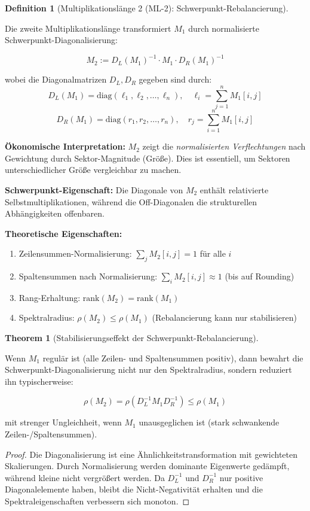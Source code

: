 \documentclass[a4paper,12pt]{article}
\theoremstyle{definition}
\newtheorem{definition}{Definition}
\newtheorem{theorem}{Theorem}
\begin{document}
\begin{definition}[Multiplikationslänge 2 (ML-2): Schwerpunkt-Rebalancierung]
\label{def:ml2}

Die zweite Multiplikationslänge transformiert $M_1$ durch normalisierte Schwerpunkt-Diagonalisierung:

\[
M_2 := D_L(M_1)^{-1} \cdot M_1 \cdot D_R(M_1)^{-1}
\]

wobei die Diagonalmatrizen $D_L, D_R$ gegeben sind durch:
\[
D_L(M_1) = \text{diag}(\ell_1, \ell_2, \ldots, \ell_n), \quad \ell_i = \sum_{j=1}^n M_1[i,j]
\]
\[
D_R(M_1) = \text{diag}(r_1, r_2, \ldots, r_n), \quad r_j = \sum_{i=1}^n M_1[i,j]
\]

\textbf{Ökonomische Interpretation:} $M_2$ zeigt die \emph{normalisierten Verflechtungen} nach Gewichtung durch Sektor-Magnitude (Größe). Dies ist essentiell, um Sektoren unterschiedlicher Größe vergleichbar zu machen.

\textbf{Schwerpunkt-Eigenschaft:} Die Diagonale von $M_2$ enthält relativierte Selbstmultiplikationen, während die Off-Diagonalen die strukturellen Abhängigkeiten offenbaren.

\textbf{Theoretische Eigenschaften:}
\begin{enumerate}
\item Zeilensummen-Normalisierung: $\sum_j M_2[i,j] = 1$ für alle $i$
\item Spaltensummen nach Normalisierung: $\sum_i M_2[i,j] \approx 1$ (bis auf Rounding)
\item Rang-Erhaltung: $\mathrm{rank}(M_2) = \mathrm{rank}(M_1)$
\item Spektralradius: $\rho(M_2) \leq \rho(M_1)$ (Rebalancierung kann nur stabilisieren)
\end{enumerate}
\end{definition}

\begin{theorem}[Stabilisierungseffekt der Schwerpunkt-Rebalancierung]
\label{thm:ml2_stabilisierung}

Wenn $M_1$ regulär ist (alle Zeilen- und Spaltensummen positiv), dann bewahrt die Schwerpunkt-Diagonalisierung nicht nur den Spektralradius, sondern reduziert ihn typischerweise:

\[
\rho(M_2) = \rho(D_L^{-1} M_1 D_R^{-1}) \leq \rho(M_1)
\]

mit strenger Ungleichheit, wenn $M_1$ unausgeglichen ist (stark schwankende Zeilen-/Spaltensummen).

\begin{proof}
Die Diagonalisierung ist eine Ähnlichkeitstransformation mit gewichteten Skalierungen. Durch Normalisierung werden dominante Eigenwerte gedämpft, während kleine nicht vergrößert werden. Da $D_L^{-1}$ und $D_R^{-1}$ nur positive Diagonalelemente haben, bleibt die Nicht-Negativität erhalten und die Spektraleigenschaften verbessern sich monoton.
\end{proof}
\end{theorem}
\end{document}
